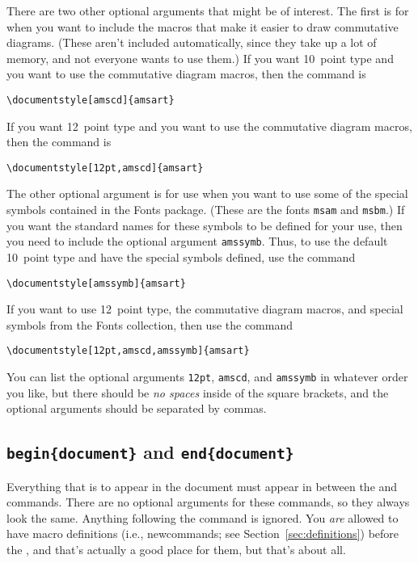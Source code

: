 There are two other optional arguments that might be of interest.
The first is for when you want to include the macros that make it
easier to draw commutative diagrams.  (These aren't included
automatically, since they take up a lot of memory, and not everyone
wants to use them.)  If you want 10~point type and
you want to use the commutative diagram macros, then the command
is
\begin{center}
\verb"\documentstyle[amscd]{amsart}"
\end{center}
If you want 12~point type and you want to use the commutative
diagram macros, then the command is
\begin{center}
\verb"\documentstyle[12pt,amscd]{amsart}"
\end{center}
The other optional argument is for use when you want to use some of
the special symbols contained in the \AmS{}Fonts package.  (These are
the fonts \verb"msam" and \verb"msbm".)  If you want the standard
names for these symbols to be defined for your use, then you need to
include the optional argument \verb"amssymb".  Thus, to use the
default 10~point type and have the special symbols defined, use the
command
\begin{center}
\verb"\documentstyle[amssymb]{amsart}"
\end{center}
If you want to use 12~point type, the commutative diagram macros, and
special symbols from the \AmS{}Fonts collection, then use the command
\begin{center}
\verb"\documentstyle[12pt,amscd,amssymb]{amsart}"
\end{center}
You can list the optional arguments \verb"12pt", \verb"amscd", and
\verb"amssymb" in
whatever order you like, but there should be {\em no spaces\/}
inside of the square brackets, and the optional arguments should be
separated by commas.




\subsection{{\tt begin\{document\}} and
{\tt end\{document\}}}

Everything that is to appear in the document must appear in between
the \verb"" and \verb"" commands. There
are no optional arguments for these commands, so they always look the
same.  Anything following the \verb"" command is
ignored.  You {\em are\/} allowed to have macro definitions (i.e.,
newcommands; see Section~\ref{sec:definitions}) before the
\verb"", and that's actually a good place for them, but
that's about all.

